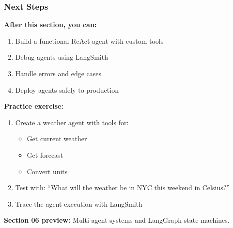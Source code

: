 \documentclass[aspectratio=169,11pt]{beamer}
\begin{document}
\begin{frame}
\frametitle{Next Steps}

\textbf{After this section, you can:}
\begin{enumerate}
  \item Build a functional ReAct agent with custom tools
  \item Debug agents using LangSmith
  \item Handle errors and edge cases
  \item Deploy agents safely to production
\end{enumerate}

\vspace{0.5cm}

\textbf{Practice exercise:}
\begin{enumerate}
  \item Create a weather agent with tools for:
    \begin{itemize}
      \item Get current weather
      \item Get forecast
      \item Convert units
    \end{itemize}
  \item Test with: ``What will the weather be in NYC this weekend in Celsius?''
  \item Trace the agent execution with LangSmith
\end{enumerate}

\vspace{0.5cm}

\textbf{Section 06 preview:} Multi-agent systems and LangGraph state machines.

\end{frame}
\end{document}
